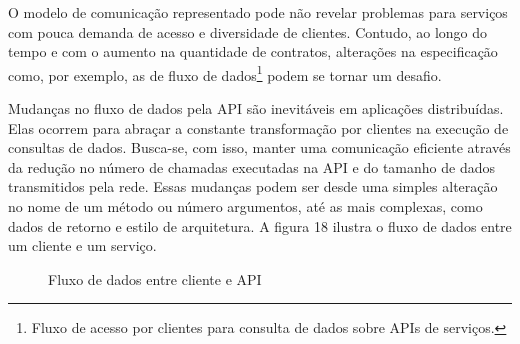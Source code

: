 O modelo de comunicação representado pode não revelar problemas para serviços com pouca demanda de acesso e diversidade de clientes. Contudo, ao longo do tempo e com o aumento na quantidade de contratos, alterações na especificação como, por exemplo, as de fluxo de dados\footnote{
  Fluxo de acesso por clientes para consulta de dados sobre APIs de serviços.
} podem se tornar um desafio.

Mudanças no fluxo de dados pela API são inevitáveis em aplicações distribuídas. Elas ocorrem para abraçar a constante transformação por clientes na execução de consultas de dados. Busca-se, com isso, manter uma comunicação eficiente através da redução no número de chamadas executadas na API e do tamanho de dados transmitidos pela rede. Essas mudanças podem ser desde uma simples alteração no nome de um método ou número argumentos, até as mais complexas, como dados de retorno e estilo de arquitetura. A figura 18 ilustra o fluxo de dados entre um cliente e um serviço.

\begin{figure}[H]
  \centering
  \caption{Fluxo de dados entre cliente e API}
\end{figure}

